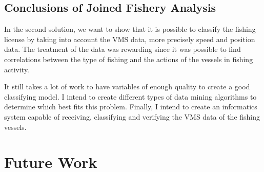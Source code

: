 
\subsection{Conclusions of Joined Fishery Analysis} %
\label{sub:con_jfa}
In the second solution, we want to show that it is possible to classify the fishing license by taking into account the VMS data, more precisely speed and position data.
The treatment of the data was rewarding since it was possible to find correlations between the type of fishing and the actions of the vessels in fishing activity.

It still takes a lot of work to have variables of enough quality to create a good classifying model.
I intend to create different types of data mining algorithms to determine which best fits this problem.
Finally, I intend to create an informatics system capable of receiving, classifying and verifying the VMS data of the fishing vessels.


\section{Future Work} %
\label{sub:future_work}






